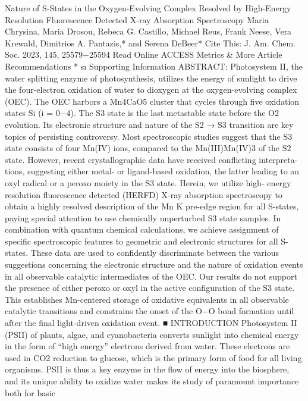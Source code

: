\documentclass{article}
\begin{document}

Nature of S‑States in the Oxygen-Evolving Complex Resolved by
High-Energy Resolution Fluorescence Detected X‑ray Absorption
Spectroscopy
Maria Chrysina, Maria Drosou, Rebeca G. Castillo, Michael Reus, Frank Neese, Vera Krewald,
Dimitrios A. Pantazis,* and Serena DeBeer*
Cite This: J. Am. Chem. Soc. 2023, 145, 25579−25594
Read Online
ACCESS
Metrics \& More
Article Recommendations
*
sı
Supporting Information
ABSTRACT: Photosystem II, the water splitting enzyme of photosynthesis,
utilizes the energy of sunlight to drive the four-electron oxidation of water to
dioxygen at the oxygen-evolving complex (OEC). The OEC harbors a
Mn4CaO5 cluster that cycles through five oxidation states Si (i = 0−4). The
S3 state is the last metastable state before the O2 evolution. Its electronic
structure and nature of the S2 → S3 transition are key topics of persisting
controversy. Most spectroscopic studies suggest that the S3 state consists of
four Mn(IV) ions, compared to the Mn(III)Mn(IV)3 of the S2 state.
However, recent crystallographic data have received conflicting interpreta-
tions, suggesting either metal- or ligand-based oxidation, the latter leading to
an oxyl radical or a peroxo moiety in the S3 state. Herein, we utilize high-
energy resolution fluorescence detected (HERFD) X-ray absorption spectroscopy to obtain a highly resolved description of the Mn
K pre-edge region for all S-states, paying special attention to use chemically unperturbed S3 state samples. In combination with
quantum chemical calculations, we achieve assignment of specific spectroscopic features to geometric and electronic structures for all
S-states. These data are used to confidently discriminate between the various suggestions concerning the electronic structure and the
nature of oxidation events in all observable catalytic intermediates of the OEC. Our results do not support the presence of either
peroxo or oxyl in the active configuration of the S3 state. This establishes Mn-centered storage of oxidative equivalents in all
observable catalytic transitions and constrains the onset of the O−O bond formation until after the final light-driven oxidation event.
■ INTRODUCTION
Photosystem II (PSII) of plants, algae, and cyanobacteria
converts sunlight into chemical energy in the form of “high
energy” electrons derived from water. These electrons are used
in CO2 reduction to glucose, which is the primary form of food
for all living organisms. PSII is thus a key enzyme in the flow of
energy into the biosphere, and its unique ability to oxidize
water makes its study of paramount importance both for basic
\end{document}
